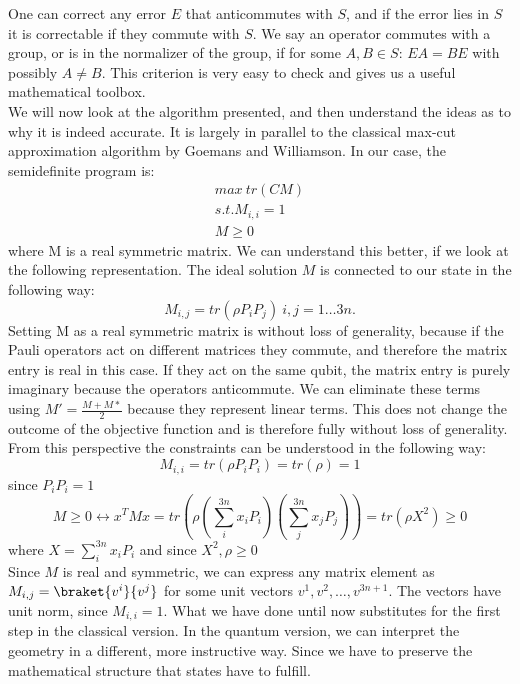 One can correct any error $E$ that anticommutes with $S$, and if the error lies in $S$ it is correctable if they commute with $S$.\cite{gottesman97}
We say an operator commutes with a group, or is in the normalizer of the group, if for some $A,B\in S$: $EA=BE$ with possibly $A\neq B$.
This criterion is very easy to check and gives us a useful mathematical toolbox. \\
We will now look at the algorithm presented, and then understand the ideas as to why it is indeed accurate.
It is largely in parallel to the classical max-cut approximation algorithm by Goemans and Williamson.
In our case, the semidefinite program is:
\begin{align*}
max ~ tr\left( CM \right)\\
s.t. M_{i,i} = 1 \\
M \ge 0
\end{align*}
where M is a real symmetric matrix.
We can understand this better, if we look at the following representation.
The ideal solution $M$ is connected to our state in the following way:\cite{gharibian19}
\[
	M_{i,j} = tr\left( \rho P_{i}P_j \right) ~ i,j=1\ldots 3n
.\]
Setting M as a real symmetric matrix is without loss of generality, because if the Pauli operators act on different matrices they commute, and therefore the matrix entry is real in this case.
If they act on the same qubit, the matrix entry is purely imaginary because the operators anticommute.
We can eliminate these terms using $M'=\frac{M+M*}{2}$ because they represent linear terms.
This does not change the outcome of the objective function and is therefore fully without loss of generality.
From this perspective the constraints can be understood in the following way:
$$M_{i,i}=tr\left( \rho P_i P_i\right) = tr\left( \rho\right) = 1  $$ since $P_iP_i=1$
$$M\ge 0\leftrightarrow x^TMx=tr\left(\rho\left(\sum_{i}^{3n} x_iP_i\right)\left(\sum_{j}^{3n} x_jP_j\right)\right)=tr\left(\rho X^2\right)\ge 0$$ where $X=\sum_{i}^{3n} x_iP_i$ and since $X^2,\rho\ge 0$
 \\
Since $M$ is real and symmetric, we can express any matrix element as $M_{i,j}=\braket{v^i}{v^j}$ for some unit vectors $v^1, v^2,\ldots, v^{3n+1}$.
The vectors have unit norm, since $M_{i,i}=1$.
What we have done until now substitutes for the first step in the classical version.
In the quantum version, we can interpret the geometry in a different, more instructive way.
Since we have to preserve the mathematical structure that states have to fulfill.
